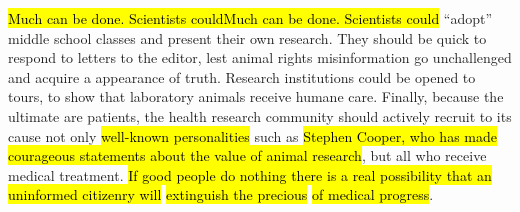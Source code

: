  \hl{Much can be done. Scientists couldMuch can be done. Scientists could} “adopt” middle school classes and present their own research. They should be quick to respond to letters to the editor, lest animal rights misinformation go unchallenged and acquire a
 appearance of truth. Research institutions could be opened to tours, to show that laboratory animals receive humane care. Finally, because the ultimate 
 are patients, the health research community should actively recruit to its cause not only 
\hl{well-known personalities} such as \hl{Stephen Cooper, who has made courageous statements about the value of animal research}, but all who receive medical treatment. 
\hl{If good people do nothing there is a real possibility that an} 
\hl{uninformed citizenry will} \hl{extinguish the precious}  \hl{of medical progress}.
